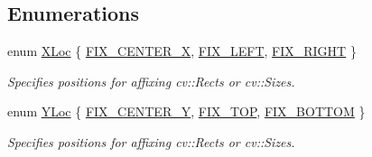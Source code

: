 \subsection*{Enumerations}
{\bf }\par
\begin{DoxyCompactItemize}
\item 
enum \hyperlink{namespacecvutils_a955c1d8733f727414da8a357b938ced7}{X\-Loc} \{ \hyperlink{namespacecvutils_a955c1d8733f727414da8a357b938ced7a6a9a0a917be940c0641d145580dcf0f7}{F\-I\-X\-\_\-\-C\-E\-N\-T\-E\-R\-\_\-\-X}, 
\hyperlink{namespacecvutils_a955c1d8733f727414da8a357b938ced7a2557bbfc7f88e4a68d6ed50b1f59df49}{F\-I\-X\-\_\-\-L\-E\-F\-T}, 
\hyperlink{namespacecvutils_a955c1d8733f727414da8a357b938ced7afb4808b8ea22de530ed6c9bc7198161a}{F\-I\-X\-\_\-\-R\-I\-G\-H\-T}
 \}
\begin{DoxyCompactList}\small\item\em Specifies positions for affixing {\ttfamily cv\-::\-Rect}s or {\ttfamily cv\-::\-Size}s. \end{DoxyCompactList}\item 
enum \hyperlink{namespacecvutils_a0a32f5be1c20397001a2cdc59bacec81}{Y\-Loc} \{ \hyperlink{namespacecvutils_a0a32f5be1c20397001a2cdc59bacec81ad6382055c3ad3cb882f8f123e3b64f38}{F\-I\-X\-\_\-\-C\-E\-N\-T\-E\-R\-\_\-\-Y}, 
\hyperlink{namespacecvutils_a0a32f5be1c20397001a2cdc59bacec81a1ef7dcf2027f67cb73fe3c2b8283e680}{F\-I\-X\-\_\-\-T\-O\-P}, 
\hyperlink{namespacecvutils_a0a32f5be1c20397001a2cdc59bacec81a3f77fa48f399deb5768cbcf63d1f9eae}{F\-I\-X\-\_\-\-B\-O\-T\-T\-O\-M}
 \}
\begin{DoxyCompactList}\small\item\em Specifies positions for affixing {\ttfamily cv\-::\-Rect}s or {\ttfamily cv\-::\-Size}s. \end{DoxyCompactList}\end{DoxyCompactItemize}


